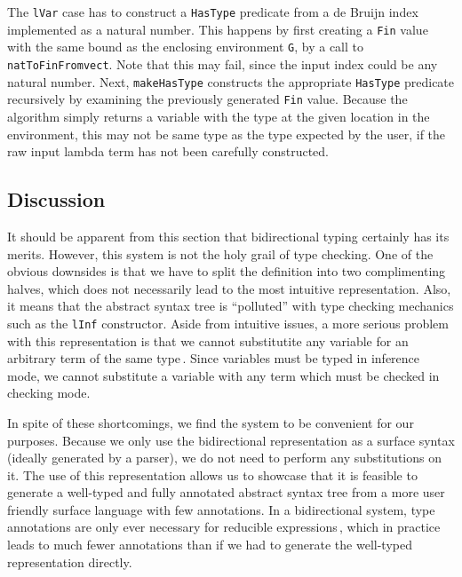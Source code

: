 The \texttt{lVar} case has to construct a \texttt{HasType} predicate from a de Bruijn index implemented as a natural number. This happens by first creating a \texttt{Fin} value with the same bound as the enclosing environment \texttt{G}, by a call to \texttt{natToFinFromvect}. Note that this may fail, since the input index could be any natural number. Next, \texttt{makeHasType} constructs the appropriate \texttt{HasType} predicate recursively by examining the previously generated \texttt{Fin} value. Because the algorithm simply returns a variable with the type at the given location in the environment, this may not be same type as the type expected by the user, if the raw input lambda term has not been carefully constructed.

\subsection{Discussion}
It should be apparent from this section that bidirectional typing certainly has its merits. However, this system is not the holy grail of type checking. One of the obvious downsides is that we have to split the definition into two complimenting halves, which does not necessarily lead to the most intuitive representation. Also, it means that the abstract syntax tree is ``polluted'' with type checking mechanics such as the \texttt{lInf} constructor. Aside from intuitive issues, a more serious problem with this representation is that we cannot substitutite any variable for an arbitrary term of the same type\,\cite{Christiansen:bidirectional}. Since variables must be typed in inference mode, we cannot substitute a variable with any term which must be checked in checking mode.

In spite of these shortcomings, we find the system to be convenient for our purposes. Because we only use the bidirectional representation as a surface syntax (ideally generated by a parser), we do not need to perform any substitutions on it. The use of this representation allows us to showcase that it is feasible to generate a well-typed and fully annotated abstract syntax tree from a more user friendly surface language with few annotations. In a bidirectional system, type annotations are only ever necessary for reducible expressions\,\cite{Dunfield13:bidir}, which in practice leads to much fewer annotations than if we had to generate the well-typed representation directly.

